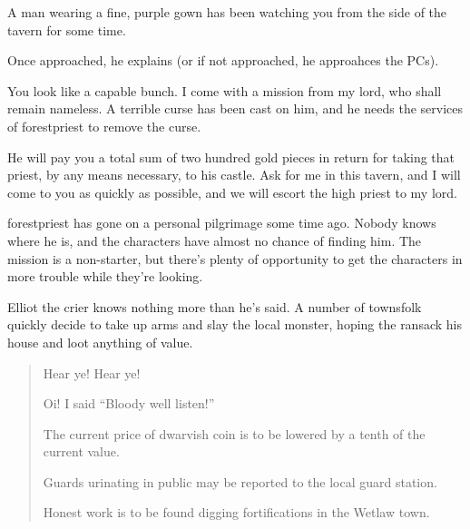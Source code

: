 \begin{multicols}{2}

\begin{boxtext}

	A man wearing a fine, purple gown has been watching you from the side of the tavern for some time.

\end{boxtext}

Once approached, he explains (or if not approached, he approahces the PCs).

\begin{speechtext}

	You look like a capable bunch.  I come with a mission from my lord, who shall remain nameless.  A terrible curse has been cast on him, and he needs the services of \gls{forestpriest} to remove the curse.

	He will pay you a total sum of two hundred gold pieces in return for taking that priest, by any means necessary, to his castle.  Ask for me in this tavern, and I will come to you as quickly as possible, and we will escort the high priest to my lord.

\end{speechtext}

\gls{forestpriest} has gone on a personal pilgrimage some time ago.  Nobody knows where he is, and the characters have almost no chance of finding him.  The mission is a non-starter, but there's plenty of opportunity to get the characters in more trouble while they're looking.

\label{nathaniel}
\humandiplomat


Elliot the crier knows nothing more than he's said.  A number of townsfolk quickly decide to take up arms and slay the local monster, hoping the ransack his house and loot anything of value.

\begin{boxtext}
	\begin{verse}
		Hear ye! Hear ye!

		Oi! I said ``Bloody well listen!''

		The current price of dwarvish coin is to be lowered by a tenth of the current value.

		Guards urinating in public may be reported to the local guard station.

		Honest work is to be found digging fortifications in the Wetlaw town.


\end{verse}
\end{boxtext}
\end{multicols}
